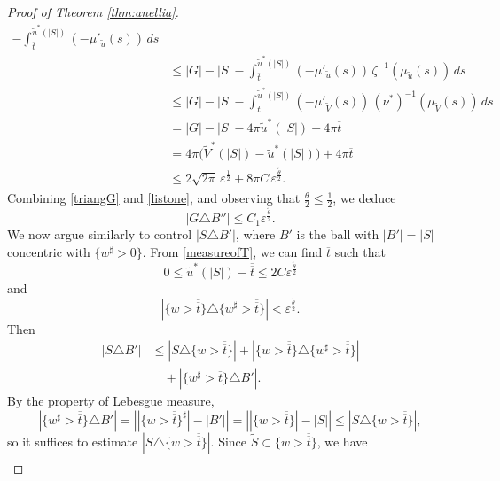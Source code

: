 \documentclass[oneside,a4paper,11pt,notitlepage]{article}
\newcommand{\abs}[1]{{\left|#1\right|}}
\theoremstyle{definition}
\theoremstyle{plain}
\theoremstyle{definition}
\begin{document}
\begin{proof}[Proof of Theorem \ref{thm:anellia}]
\begin{equation}
\begin{aligned}
- \int_{\overline t}^{\tilde u^*(|S|)} (-\mu'_{\tilde u}(s))\,ds \\
&\leq |G| - |S|
- \int_{\overline t}^{\tilde u^*(|S|)}
(-\mu'_{\tilde u}(s))\,\zeta^{-1}(\mu_{\tilde u}(s))\,ds \\
&\leq |G| - |S|
- \int_{\overline t}^{\tilde u^*(|S|)}
(-\mu'_{\tilde V}(s))\,(\nu^*)^{-1}(\mu_{\tilde V}(s))\,ds \\
&= |G| - |S| - 4\pi \tilde u^*(|S|) + 4\pi \overline t \\
&= 4\pi\bigl(\tilde V^*(|S|)-\tilde u^*(|S|)\bigr) + 4\pi \overline t \\
&\leq 2\sqrt{2\pi}\,\varepsilon^{\frac12}
+ 8\pi C\,\varepsilon^{\frac{\tilde\theta}{2}}.
\end{aligned}
\end{equation}
Combining \eqref{triangG} and \eqref{listone}, and observing that $\frac{\tilde\theta}{2}\leq\frac12$, we deduce
\begin{equation*}
|G\triangle B''| \leq C_1 \varepsilon^{\frac{\tilde\theta}{2}}.
\end{equation*}
We now argue similarly to control $|S\triangle B'|$, where $B'$ is the ball with $|B'|=|S|$ concentric with $\{w^\sharp>0\}$. From \eqref{measureofT}, we can find $\overline{\overline t}$ such that
\[
0 \leq \tilde u^*(|S|)-\overline{\overline t}
\leq 2C\varepsilon^{\frac{\tilde\theta}{2}}
\]
and
\begin{equation*}
|\{w>\overline{\overline t}\}\triangle\{w^\sharp>\overline{\overline t}\}|
< \varepsilon^{\frac{\tilde\theta}{2}}.
\end{equation*}
Then
\begin{equation}
\label{assS}
\begin{aligned}
|S\triangle B'|
&\leq |S\triangle\{w>\overline{\overline t}\}|
+ |\{w>\overline{\overline t}\}\triangle\{w^\sharp>\overline{\overline t}\}| \\
&\quad + |\{w^\sharp>\overline{\overline t}\}\triangle B'|.
\end{aligned}
\end{equation}
By the property of Lebesgue measure,
\[
|\{w^\sharp>\overline{\overline t}\}\triangle B'|=\abs{\abs{\{w>\overline{\overline{t}}\}^\sharp}-\abs{B'}}=\abs{\abs{\{w>\overline{\overline{t}}\}}-\abs{S}}
\leq |S\triangle\{w>\overline{\overline t}\}|,
\]
so it suffices to estimate $|S\triangle\{w>\overline{\overline t}\}|$. Since $\tilde S \subset \{w>\overline{\overline t}\}$, we have
\begin{equation*}
\begin{aligned}

\end{aligned}
\end{equation*}
\end{proof}
\end{document}
